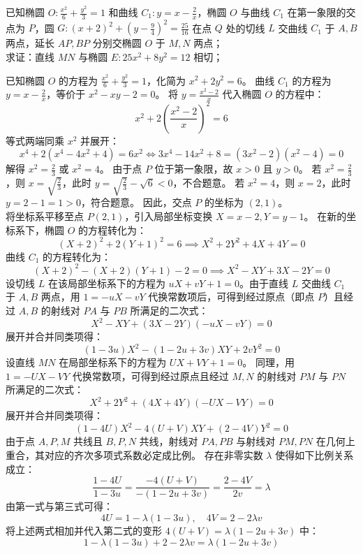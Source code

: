 \begin{example}
已知椭圆 $O: \frac{x^2}{6} + \frac{y^2}{3} = 1$ 和曲线 $C_1: y = x - \frac{2}{x}$，椭圆 $O$ 与曲线 $C_1$ 在第一象限的交点为 $P$，圆 $G: (x+2)^2 + \left(y-\frac{9}{4}\right)^2 = \frac{25}{16}$ 在点 $Q$ 处的切线 $L$ 交曲线 $C_1$ 于 $A,B$ 两点，延长 $AP,BP$ 分别交椭圆 $O$ 于 $M,N$ 两点；\\
求证：直线 $MN$ 与椭圆 $E: 25x^2 + 8y^2 = 12$ 相切；
\end{example}
\begin{solution}
已知椭圆 $O$ 的方程为 $\frac{x^2}{6} + \frac{y^2}{3} = 1$，化简为 $x^2 + 2y^2 = 6$。
曲线 $C_1$ 的方程为 $y = x - \frac{2}{x}$，等价于 $x^2 - xy - 2 = 0$。
将 $y = \frac{x^2 - 2}{x}$ 代入椭圆 $O$ 的方程中：
$$ x^2 + 2\left(\frac{x^2 - 2}{x}\right)^2 = 6 $$
等式两端同乘 $x^2$ 并展开：
$$ x^4 + 2(x^4 - 4x^2 + 4) = 6x^2 \Leftrightarrow 3x^4 - 14x^2 + 8 =(3x^2 - 2)(x^2 - 4) = 0 $$
解得 $x^2 = \frac{2}{3}$ 或 $x^2 = 4$。
由于点 $P$ 位于第一象限，故 $x > 0$ 且 $y > 0$。
若 $x^2 = \frac{2}{3}$，则 $x = \sqrt{\frac{2}{3}}$，此时 $y = \sqrt{\frac{2}{3}} - \sqrt{6} < 0$，不合题意。
若 $x^2 = 4$，则 $x = 2$，此时 $y = 2 - 1 = 1 > 0$，符合题意。
因此，交点 $P$ 的坐标为 $(2, 1)$。\\
将坐标系平移至点 $P(2, 1)$，引入局部坐标变换 $X = x - 2, Y = y - 1$。
在新的坐标系下，椭圆 $O$ 的方程转化为：
$$ (X + 2)^2 + 2(Y + 1)^2 = 6 \implies X^2 + 2Y^2 + 4X + 4Y = 0 $$
曲线 $C_1$ 的方程转化为：
$$ (X + 2)^2 - (X + 2)(Y + 1) - 2 = 0 \implies X^2 - XY + 3X - 2Y = 0 $$
设切线 $L$ 在该局部坐标系下的方程为 $uX + vY + 1 = 0$。由于直线 $L$ 交曲线 $C_1$ 于 $A, B$ 两点，用 $1 = -uX - vY$ 代换常数项后，可得到经过原点（即点 $P$）且经过 $A, B$ 的射线对 $PA$ 与 $PB$ 所满足的二次式：
$$ X^2 - XY + (3X - 2Y)(-uX - vY) = 0 $$
展开并合并同类项得：
$$ (1 - 3u)X^2 - (1 - 2u + 3v)XY + 2vY^2 = 0 $$
设直线 $MN$ 在局部坐标系下的方程为 $UX + VY + 1 = 0$。
同理，用 $1 = -UX - VY$ 代换常数项，可得到经过原点且经过 $M, N$ 的射线对 $PM$ 与 $PN$ 所满足的二次式：
$$ X^2 + 2Y^2 + (4X + 4Y)(-UX - VY) = 0 $$
展开并合并同类项得：
$$ (1 - 4U)X^2 - 4(U + V)XY + (2 - 4V)Y^2 = 0 $$
由于点 $A, P, M$ 共线且 $B, P, N$ 共线，射线对 $PA, PB$ 与射线对 $PM, PN$ 在几何上重合，其对应的齐次多项式系数必定成比例。
存在非零实数 $\lambda$ 使得如下比例关系成立：
$$ \frac{1 - 4U}{1 - 3u} = \frac{-4(U + V)}{-(1 - 2u + 3v)} = \frac{2 - 4V}{2v} = \lambda $$
由第一式与第三式可得：
$$ 4U = 1 - \lambda(1 - 3u), \quad 4V = 2 - 2\lambda v $$
将上述两式相加并代入第二式的变形 $4(U + V) = \lambda(1 - 2u + 3v)$ 中：
$$ 1 - \lambda(1 - 3u) + 2 - 2\lambda v = \lambda(1 - 2u + 3v) $$

\end{solution}
